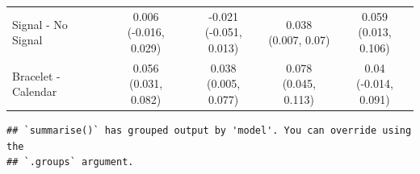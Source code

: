 \documentclass[
]{article}
\begin{document}
\begin{table}
{\begin{tabular}[t]{lcccc}
Signal - No Signal & \makecell[c]{0.006\\(-0.016, 0.029)} & \makecell[c]{-0.021\\(-0.051, 0.013)} & \makecell[c]{0.038\\(0.007, 0.07)} & \makecell[c]{0.059\\(0.013, 0.106)}\\
Bracelet - Calendar & \makecell[c]{0.056\\(0.031, 0.082)} & \makecell[c]{0.038\\(0.005, 0.077)} & \makecell[c]{0.078\\(0.045, 0.113)} & \makecell[c]{0.04\\(-0.014, 0.091)}\\
\bottomrule
\end{tabular}}
\end{table}

\begin{verbatim}
## `summarise()` has grouped output by 'model'. You can override using the
## `.groups` argument.
\end{verbatim}
\end{document}
